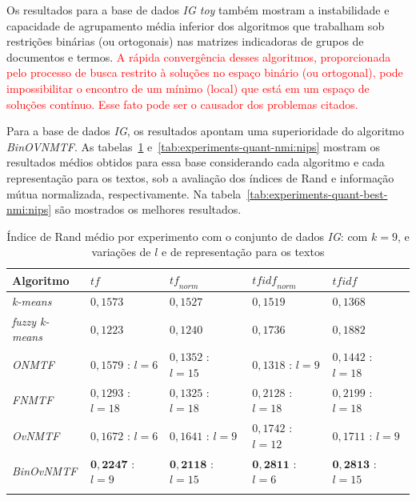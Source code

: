 \documentclass[
    12pt,                %
    oneside,            %
    a4paper,            %
    english,            %
    brazil                %
    ]{abntex2ppgsi}
\begin{document}
Os resultados para a base de dados \textit{IG toy} também mostram a instabilidade e capacidade de agrupamento média inferior dos algoritmos que trabalham sob restrições binárias (ou ortogonais) nas matrizes indicadoras de grupos de documentos e termos. \textcolor{red}{A rápida convergência desses algoritmos, proporcionada pelo processo de busca restrito à soluções no espaço binário (ou ortogonal), pode impossibilitar o encontro de um mínimo (local) que está em um espaço de soluções contínuo. Esse fato pode ser o causador dos problemas citados.}



Para a base de dados \textit{IG}, os resultados apontam uma superioridade do algoritmo \textit{BinOVNMTF}. As tabelas~\ref{tab:experiments-quant-rand:nips} e~\ref{tab:experiments-quant-nmi:nips} mostram os resultados médios obtidos para essa base considerando cada algoritmo e cada representação para os textos, sob a avaliação dos índices de Rand e informação mútua normalizada, respectivamente. Na tabela~\ref{tab:experiments-quant-best-nmi:nips} são mostrados os melhores resultados.

\begin{table}[H]
\centering
    \caption{Índice de Rand médio por experimento com o conjunto de dados \textit{IG}: com $k = 9$, e variações de $l$ e de representação para os textos}
    \begin{tabular}{lllll}
        \hline
        \textbf{Algoritmo}              & $\textit{tf}$ & $\textit{tf}_{norm}$ & $\textit{tfidf}_{norm}$ & $\textit{tfidf}$ \\
        \hline
        \textit{k-means}       & $0,1573$            & $0,1527$            & $0,1519$            & $0,1368$ \\
        \textit{fuzzy k-means} & $0,1223$            & $0,1240$            & $0,1736$            & $0,1882$ \\
        \textit{ONMTF}         & $0,1579$ : $l = 6$  & $0,1352$ : $l = 15$ & $0,1318$ : $l = 9$  & $0,1442$ : $l = 18$ \\
        \textit{FNMTF}         & $0,1293$ : $l = 18$ & $0,1325$ : $l = 18$ & $0,2128$ : $l = 18$ & $0,2199$ : $l = 18$ \\
        \textit{OvNMTF}        & $0,1672$ : $l = 6$  & $0,1641$ : $l = 9$  & $0,1742$ : $l = 12$ & $0,1711$ : $l = 9$ \\
        \textit{BinOvNMTF}     & $\mathbf{0,2247}$ : $l = 9$ & $\mathbf{0,2118}$ : $l = 15$ & $\mathbf{0,2811}$ : $l = 6$ & $\mathbf{0,2813}$ : $l = 15$ \\
        \hline \\
    \end{tabular}
    \label{tab:experiments-quant-rand:nips}
\end{table}
\end{document}
